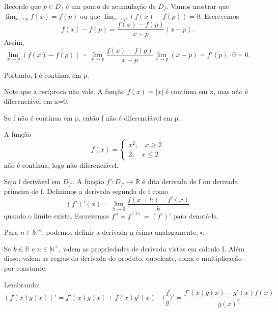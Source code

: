 \documentclass[analysis_notes.tex]{subfiles}
\begin{document}
\begin{proof*}
	Recorde que \(p\in D_{f}\) é um ponto de acumula\c cão de \(D_{f}\).
	Vamos mostrar que \(\lim_{x\to p}f(x)=f(p)\) ou que \(\lim_{x\to p}(f(x)-f(p))=0.\)
	Escrevemos
	\[
		f(x)-f(p) = \frac{f(x)-f(p)}{x-p}(x-p).
	\]
	Assim,
	\[
		\lim_{x\to p}(f(x)-f(p)) = \lim_{x\to p}\frac{f(x)-f(p)}{x-p}\lim_{x\to p}(x-p) = f'(p)\cdot 0 = 0.
	\]

	Portanto, f é contínua em p.
\end{proof*}
Note que a recíproca não vale. A fun\c cão \(f(x) = |x|\) é contínua em x, mas
não é diferenciável em x=0.
\hypertarget{negative_diff}{   \begin{example}
		Se f não é contínua em p, então f não é diferenciável em p.
	\end{example}}
\begin{example}
	A fun\c cão
	\[
		f(x) = \left\{\begin{array}{ll}
			x^2,\quad x\geq 2 \\
			2,\quad x\leq 2
		\end{array}\right.
	\]
	não é contínua, logo não diferenciável.
\end{example}
\begin{def*}
	Seja f derivável em \(D_{f'}\). A fun\c cão \(f':D_{f'}\rightarrow \mathbb{R}\)
	é dita derivada de f ou derivada primeira de f. Definimos a derivada segunda de f
	como
	\[
		(f')'(x) = \lim_{h\to 0}\frac{f(x+h)-f'(x)}{h}
	\]
	quando o limite existe. Escrevemos \(f''=f^{(2)} = (f')'\) para denotá-la.

	Para \(n \in\mathbb{N}^{\times}\), podemos definir a derivada n-ésima analogamente. \(\square\).
\end{def*}
\begin{theorem*}
	Se \(k\in \mathbb{R}\) e \(n\in \mathbb{N}^{\times}\), valem as propriedades
	de derivada vistas em cálculo I. Além disso, valem as regras
	da derivada do produto, quociente, soma e multiplica\c cão por constante.
\end{theorem*}
Lembrando:
\[
	(f(x)g(x))' = f'(x)g(x) + f(x)g'(x)\quad \biggl(\frac{f}{g}\biggr)' = \frac{f'(x)g(x) - g'(x)f(x)}{g(x)^2}
\]
\end{document}
